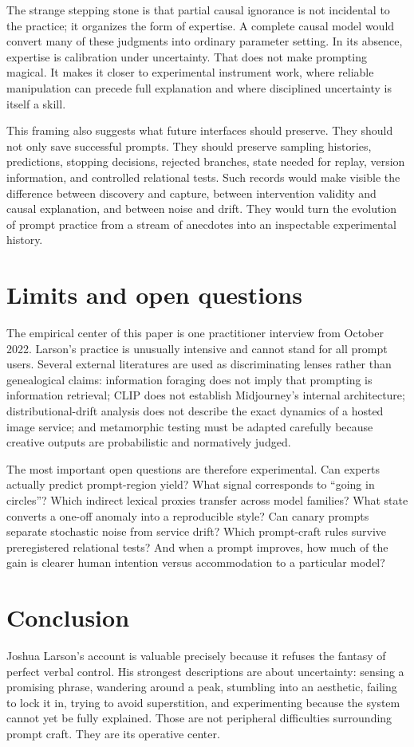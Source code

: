 \documentclass[11pt]{article}
\begin{document}
The strange stepping stone is that partial causal ignorance is not incidental to the practice; it organizes the form of expertise. A complete causal model would convert many of these judgments into ordinary parameter setting. In its absence, expertise is calibration under uncertainty. That does not make prompting magical. It makes it closer to experimental instrument work, where reliable manipulation can precede full explanation and where disciplined uncertainty is itself a skill.

This framing also suggests what future interfaces should preserve. They should not only save successful prompts. They should preserve sampling histories, predictions, stopping decisions, rejected branches, state needed for replay, version information, and controlled relational tests. Such records would make visible the difference between discovery and capture, between intervention validity and causal explanation, and between noise and drift. They would turn the evolution of prompt practice from a stream of anecdotes into an inspectable experimental history.

\section{Limits and open questions}
The empirical center of this paper is one practitioner interview from October 2022. Larson’s practice is unusually intensive and cannot stand for all prompt users. Several external literatures are used as discriminating lenses rather than genealogical claims: information foraging does not imply that prompting is information retrieval; CLIP does not establish Midjourney’s internal architecture; distributional-drift analysis does not describe the exact dynamics of a hosted image service; and metamorphic testing must be adapted carefully because creative outputs are probabilistic and normatively judged.

The most important open questions are therefore experimental. Can experts actually predict prompt-region yield? What signal corresponds to ``going in circles''? Which indirect lexical proxies transfer across model families? What state converts a one-off anomaly into a reproducible style? Can canary prompts separate stochastic noise from service drift? Which prompt-craft rules survive preregistered relational tests? And when a prompt improves, how much of the gain is clearer human intention versus accommodation to a particular model?

\section{Conclusion}
Joshua Larson’s account is valuable precisely because it refuses the fantasy of perfect verbal control. His strongest descriptions are about uncertainty: sensing a promising phrase, wandering around a peak, stumbling into an aesthetic, failing to lock it in, trying to avoid superstition, and experimenting because the system cannot yet be fully explained. Those are not peripheral difficulties surrounding prompt craft. They are its operative center.
\end{document}
